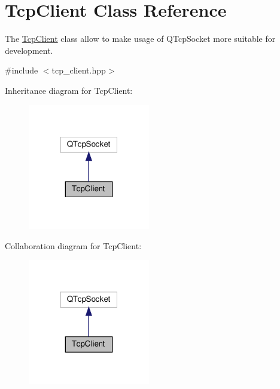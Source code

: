 \hypertarget{class_tcp_client}{}\section{Tcp\+Client Class Reference}
\label{class_tcp_client}


The \mbox{\hyperlink{class_tcp_client}{Tcp\+Client}} class allow to make usage of Q\+Tcp\+Socket more suitable for development.  




{\ttfamily \#include $<$tcp\+\_\+client.\+hpp$>$}



Inheritance diagram for Tcp\+Client\+:\nopagebreak
\begin{figure}[H]
\begin{center}
\leavevmode
\includegraphics[width=151pt]{class_tcp_client__inherit__graph}
\end{center}
\end{figure}


Collaboration diagram for Tcp\+Client\+:\nopagebreak
\begin{figure}[H]
\begin{center}
\leavevmode
\includegraphics[width=151pt]{class_tcp_client__coll__graph}
\end{center}
\end{figure}
